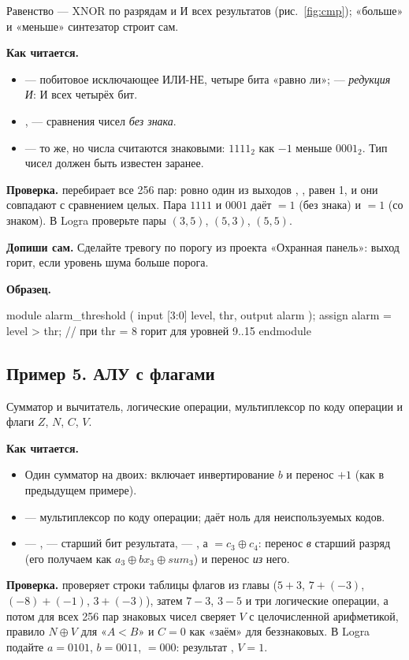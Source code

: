 Равенство --- XNOR по разрядам и И всех результатов (рис.~\ref{fig:cmp});
«больше» и «меньше» синтезатор строит сам.


\textbf{Как читается.}
\begin{itemize}
  \item {} --- побитовое исключающее ИЛИ-НЕ, четыре бита «равно ли»; \code{\&(\ldots)} --- \emph{редукция И}: И всех четырёх бит.
  \item {},  --- сравнения чисел \emph{без знака}.
  \item {} --- то же, но числа считаются знаковыми: $1111_2$ как $-1$ меньше $0001_2$. Тип чисел должен быть известен заранее.
\end{itemize}
\textbf{Проверка.}  перебирает все 256 пар: ровно один из
выходов , ,  равен 1, и они совпадают с
сравнением целых. Пара $1111$ и $0001$ даёт $=1$ (без знака) и
$=1$ (со знаком). В Logra проверьте пары $(3,5)$, $(5,3)$,
$(5,5)$.

\textbf{Допиши сам.} Сделайте тревогу по порогу из проекта «Охранная панель»:
выход горит, если уровень шума больше порога.

\textbf{Образец.}
\begin{vcode}
module alarm_threshold (
    input  [3:0] level, thr,
    output       alarm
);
    assign alarm = level > thr;   // при thr = 8 горит для уровней 9..15
endmodule
\end{vcode}

\subsection{Пример 5. АЛУ с флагами}

Сумматор и вычитатель, логические операции, мультиплексор по коду операции и
флаги $Z$, $N$, $C$, $V$.


\textbf{Как читается.}
\begin{itemize}
  \item Один сумматор на двоих:  включает инвертирование $b$ и перенос $+1$ (как в предыдущем примере).
  \item {} --- мультиплексор по коду операции;  даёт ноль для неиспользуемых кодов.
  \item {} --- ,  --- старший бит результата,  --- , а  $=c_3\oplus c_4$: перенос \emph{в} старший разряд (его получаем как $a_3\oplus bx_3\oplus sum_3$) и перенос \emph{из} него.
\end{itemize}
\textbf{Проверка.}  проверяет строки таблицы флагов из главы
($5+3$, $7+(-3)$, $(-8)+(-1)$, $3+(-3)$), затем $7-3$, $3-5$ и три логические
операции, а потом для всех 256 пар знаковых чисел сверяет $V$ с целочисленной
арифметикой, правило $N\oplus V$ для «$A<B$» и $C=0$ как «заём» для беззнаковых. В
Logra подайте $a=0101$, $b=0011$,  $=000$: результат ,
$V=1$.

